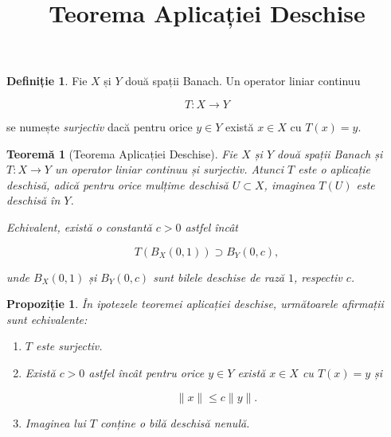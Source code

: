 \documentclass[12pt]{article}
\title{Teorema Aplicației Deschise}
\author{}
\date{}
\theoremstyle{definition}
\newtheorem{definition}{Definiție}
\theoremstyle{plain}
\newtheorem{theorem}{Teoremă}
\newtheorem{proposition}{Propoziție}
\begin{document}
\maketitle

\begin{definition}
Fie $X$ și $Y$ două spații Banach. Un operator liniar continuu


\[
T : X \to Y
\]


se numește \emph{surjectiv} dacă pentru orice $y \in Y$ există $x \in X$ cu $T(x) = y$.
\end{definition}

\begin{theorem}[Teorema Aplicației Deschise]
Fie $X$ și $Y$ două spații Banach și $T : X \to Y$ un operator liniar continuu și surjectiv. Atunci $T$ este o aplicație deschisă, adică pentru orice mulțime deschisă $U \subset X$, imaginea $T(U)$ este deschisă în $Y$.

Echivalent, există o constantă $c > 0$ astfel încât


\[
T(B_X(0,1)) \supset B_Y(0,c),
\]


unde $B_X(0,1)$ și $B_Y(0,c)$ sunt bilele deschise de rază $1$, respectiv $c$.
\end{theorem}

\begin{proposition}
În ipotezele teoremei aplicației deschise, următoarele afirmații sunt echivalente:
\begin{enumerate}
    \item[(i)] $T$ este surjectiv.
    \item[(ii)] Există $c > 0$ astfel încât pentru orice $y \in Y$ există $x \in X$ cu $T(x) = y$ și
    

\[
    \|x\| \le c \|y\|.
    \]


    \item[(iii)] Imaginea lui $T$ conține o bilă deschisă nenulă.
\end{enumerate}
\end{proposition}
\end{document}
